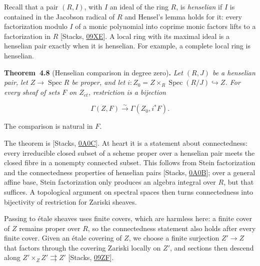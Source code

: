 \documentclass[11pt]{article}
\newenvironment{bpstatement}[2]{\par\addvspace{0.6\baselineskip}\noindent\textbf{#1}#2\textbf{.}\enspace\ignorespaces}
  {\par\addvspace{0.4\baselineskip}}
\newenvironment{bpstatementit}[2]{\begin{bpstatement}{#1}{#2}\itshape\ignorespaces}{\end{bpstatement}}
\begin{document}
Recall that a pair \((R,I)\), with \(I\) an ideal of the ring \(R\), is \emph{henselian} if \(I\) is contained in the Jacobson radical of \(R\) and Hensel's lemma holds for it: every factorization modulo \(I\) of a monic polynomial into coprime monic factors lifts to a factorization in \(R\) [Stacks, \href{https://stacks.math.columbia.edu/tag/09XE}{09XE}]. A local ring with its maximal ideal is a henselian pair exactly when it is henselian. For example, a complete local ring is henselian.

\label{bp308}%
\begin{bpstatementit}{Theorem~4.8}{ (Henselian comparison in degree zero)}
Let \((R,J)\) be a henselian pair, let \(Z\to\operatorname{Spec}R\) be proper, and let \(i:Z_0=Z\times_R\operatorname{Spec}(R/J)\hookrightarrow Z\). For every sheaf of sets \(F\) on \(Z_{\acute{e}t}\), restriction is a bijection

\[
\Gamma(Z,F)\xrightarrow{\sim}\Gamma(Z_0,i^*F).
\]

The comparison is natural in \(F\).
\end{bpstatementit}

\label{bp309}%
The theorem is [Stacks, \href{https://stacks.math.columbia.edu/tag/0A0C}{0A0C}]. At heart it is a statement about connectedness: every irreducible closed subset of a scheme proper over a henselian pair meets the closed fibre in a nonempty connected subset. This follows from Stein factorization and the connectedness properties of henselian pairs [Stacks, \href{https://stacks.math.columbia.edu/tag/0A0B}{0A0B}]; over a general affine base, Stein factorization only produces an algebra integral over \(R\), but that suffices. A topological argument on spectral spaces then turns connectedness into bijectivity of restriction for Zariski sheaves.

Passing to étale sheaves uses finite covers, which are harmless here: a finite cover of \(Z\) remains proper over \(R\), so the connectedness statement also holds after every finite cover. Given an étale covering of \(Z\), we choose a finite surjection \(Z'\to Z\) that factors through the covering Zariski locally on \(Z'\), and sections then descend along \(Z'\times_ZZ'\rightrightarrows Z'\) [Stacks, \href{https://stacks.math.columbia.edu/tag/09ZF}{09ZF}].
\end{document}
